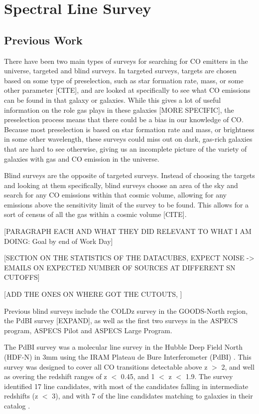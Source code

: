 \chapter{Spectral Line Survey}

\section{Previous Work}

There have been two main types of surveys for searching for CO emitters in the universe, targeted and blind surveys. In targeted surveys, targets are chosen based on some type of preselection, such as star formation rate, mass, or some other parameter [CITE], and are looked at specifically to see what CO emissions can be found in that galaxy or galaxies. While this gives a lot of useful information on the role gas plays in these galaxies [MORE SPECIFIC], the preselection process means that there could be a bias in our knowledge of CO. Because most preselection is based on star formation rate and mass, or brightness in some other wavelength, these surveys could miss out on dark, gas-rich galaxies that are hard to see otherwise, giving us an incomplete picture of the variety of galaxies with gas and CO emission in the universe. 

Blind surveys are the opposite of targeted surveys. Instead of choosing the targets and looking at them specifically, blind surveys choose an area of the sky and search for any CO emissions within that cosmic volume, allowing for any emissions above the sensitivity limit of the survey to be found. This allows for a sort of census of all the gas within a cosmic volume [CITE]. 

[PARAGRAPH EACH AND WHAT THEY DID RELEVANT TO WHAT I AM DOING: Goal by end of Work Day]

[SECTION ON THE STATISTICS OF THE DATACUBES, EXPECT NOISE -> EMAILS ON EXPECTED NUMBER OF SOURCES AT DIFFERENT SN CUTOFFS]

[ADD THE ONES ON WHERE GOT THE CUTOUTS, ]

Previous blind surveys include the COLDz survey in the GOODS-North region, the PdBI survey [EXPAND], as well as the first two surveys in the ASPECS program, ASPECS Pilot and ASPECS Large Program. 

The PdBI survey was a molecular line survey in the Hubble Deep Field North (HDF-N) in 3mm using the IRAM Plateau de Bure Interferometer (PdBI) \cite{decarli2014molecular}. This survey was designed to cover all CO transitions detectable above z $>$ 2, and well as overing the redshift ranges of z $<$ 0.45, and 1 $<$ z $<$ 1.9. The survey identified 17 line candidates, with most of the candidates falling in intermediate redshifts (z $<$ 3), and with 7 of the line candidates matching to galaxies in their catalog \cite{decarli2014molecular}. 

